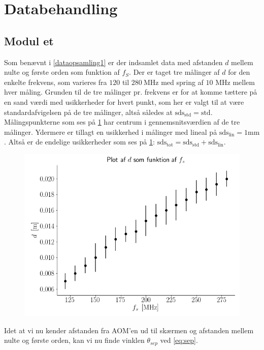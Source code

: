 \documentclass[main]{subfiles}
\begin{document}
\section{Databehandling}
\subsection{Modul et}

Som benævnt i \cref{dataopsamling1} er der indsamlet data med afstanden $d$ mellem nulte og første orden som funktion af $f_S$. Der er taget tre målinger af $d$ for den enkelte frekvens, som varieres fra $120$ til $280 \ \si{\mega\hertz}$ med spring af $10$ $\si{\mega\hertz}$ mellem hver måling. Grunden til de tre målinger pr. frekvens er for at komme tættere på en sand værdi med usikkerheder for hvert punkt, som her er valgt til at være standardafvigelsen på de tre målinger, altså således at $\text{sds}_{\text{std}} = \text{std}$. Målingspunkterne som ses på \cref{fig:rawdata_modul1} har centrum i gennemsnitsværdien af de tre målinger. Ydermere er tillagt en usikkerhed i målinger med lineal på
$ \text{sds}_{\text{lin}} = 1 \si{\milli\meter} $
. Altså er de endelige usikkerheder som ses på \cref{fig:rawdata_modul1}: $ \text{sds}_{\text{tot}} = \text{sds}_{\text{std}} + \text{sds}_{\text{lin}} $.
\begin{figure}[H]
    \centering
    \includegraphics[width=\linewidth]{tegninger/rawdata_modul1.png}
    \caption{}
    \label{fig:rawdata_modul1}
\end{figure}
Idet at vi nu kender afstanden fra AOM'en ud til skærmen og afstanden mellem nulte og første orden, kan vi nu finde vinklen $\theta_{sep}$ ved \cref{eq:sep}.
\end{document}
